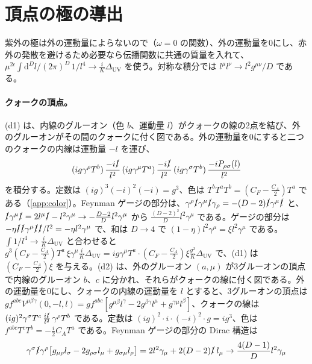 \documentclass[a4paper,10pt]{ltjsarticle}
\newcommand{\dd}{\mathrm{d}}
\newcommand{\DUV}{\Delta_{\mathrm{UV}}}
\begin{document}
\section{頂点の極の導出}\label{app:vertex}

紫外の極は外の運動量によらないので（$\omega=0$ の関数）、外の運動量を0にし、赤外の発散を避けるため必要なら伝播関数に共通の質量を入れて、$\mu^{2\epsilon}\int\dd^Dl/(2\pi)^D\,1/l^4\to\frac iK\DUV$ を使う。対称な積分では $l^\mu l^\nu\to l^2g^{\mu\nu}/D$ である。

\paragraph{クォークの頂点。}(d1) は、内線のグルーオン（色 $b$、運動量 $l$）がクォークの線の2点を結び、外のグルーオンがその間のクォークに付く図である。外の運動量を0にすると二つのクォークの内線は運動量 $-l$ を運び、
\begin{equation*}
(ig\gamma^\rho T^b)\,\frac{-i\slashed l}{l^2}\,(ig\gamma^\mu T^a)\,\frac{-i\slashed l}{l^2}\,(ig\gamma^\sigma T^b)\,\frac{-iP_{\rho\sigma}(l)}{l^2}
\end{equation*}
を積分する。定数は $(ig)^3(-i)^2(-i)=g^3$、色は $T^bT^aT^b=(C_F-\frac{C_A}2)T^a$ である（\ref{app:color}）。Feynman ゲージの部分は、$\gamma^\rho\slashed l\gamma^\mu\slashed l\gamma_\rho=-(D-2)\slashed l\gamma^\mu\slashed l$ と、$\slashed l\gamma^\mu\slashed l=2l^\mu\slashed l-l^2\gamma^\mu\to-\frac{D-2}Dl^2\gamma^\mu$ から $\frac{(D-2)^2}Dl^2\gamma^\mu$ である。ゲージの部分は $-\eta\slashed l\slashed l\gamma^\mu\slashed l\slashed l/l^2=-\eta l^2\gamma^\mu$ で、和は $D\to4$ で $(1-\eta)l^2\gamma^\mu=\xi l^2\gamma^\mu$ である。$\int1/l^4\to\frac iK\DUV$ と合わせると $g^3(C_F-\frac{C_A}2)T^a\,\xi\gamma^\mu\frac iK\DUV=ig\gamma^\mu T^a\cdot(C_F-\frac{C_A}2)\xi\frac{g^2}K\DUV$ で、(d1) は $(C_F-\frac{C_A}2)\xi$ を与える。(d2) は、外のグルーオン $(a,\mu)$ が3グルーオンの頂点で内線のグルーオン $b$、$c$ に分かれ、それらがクォークの線に付く図である。外の運動量を0にし、クォークの内線の運動量を $l$ とすると、3グルーオンの頂点は $gf^{abc}V^{\mu\beta\gamma}(0,-l,l)=gf^{abc}[g^{\mu\beta}l^\gamma-2g^{\beta\gamma}l^\mu+g^{\gamma\mu}l^\beta]$、クォークの線は $(ig)^2\gamma^\sigma T^c\,\frac{i\slashed l}{l^2}\,\gamma^\rho T^b$ である。定数は $(ig)^2\cdot i\cdot(-i)^2\cdot g=ig^3$、色は $f^{abc}T^cT^b=-\frac i2C_AT^a$ である。Feynman ゲージの部分の Dirac 構造は
\begin{equation*}
\gamma^\sigma\slashed l\gamma^\rho\bigl[g_{\mu\rho}l_\sigma-2g_{\rho\sigma}l_\mu+g_{\sigma\mu}l_\rho\bigr]=2l^2\gamma_\mu+2(D-2)\slashed l\,l_\mu\to\frac{4(D-1)}{D}l^2\gamma_\mu
\end{equation*}
\end{document}

